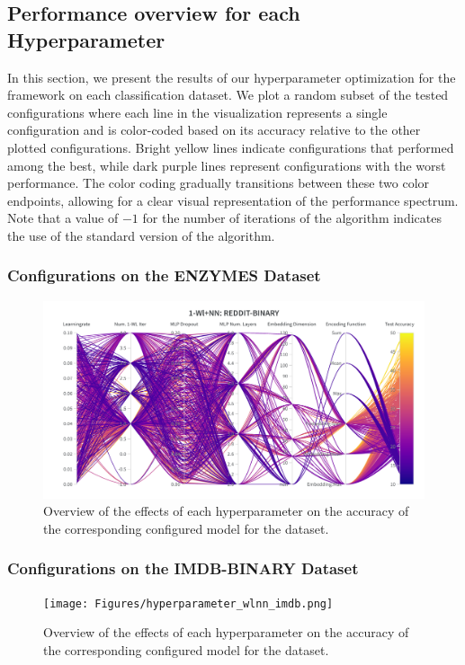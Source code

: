\subsection{Performance overview for each Hyperparameter}
In this section, we present the results of our hyperparameter optimization for the \wlnn framework on each classification dataset. We plot a random subset of the tested configurations where each line in the visualization represents a single configuration and is color-coded based on its accuracy relative to the other plotted configurations. Bright yellow lines indicate configurations that performed among the best, while dark purple lines represent configurations with the worst performance. The color coding gradually transitions between these two color endpoints, allowing for a clear visual representation of the performance spectrum. Note that a value of $-1$ for the number of iterations of the \wl algorithm indicates the use of the standard version of the algorithm.

\subsubsection{\wlnn Configurations on the ENZYMES Dataset}
\begin{figure}[H]
    \centering
    \includegraphics[width=\textwidth, trim={0 75 0 150}, clip]{Figures/hyperparameter_wlnn_enzymes.png}
    \caption{Overview of the effects of each hyperparameter on the accuracy of the corresponding configured \wlnn model for the \enzymes dataset.}
    \label{fig:wandb_wlnn_enzymes}
\end{figure}

\subsubsection{\wlnn Configurations on the IMDB-BINARY Dataset}
\begin{figure}[H]
    \centering
    \texttt{[image: Figures/hyperparameter\_wlnn\_imdb.png]}
    \caption{Overview of the effects of each hyperparameter on the accuracy of the corresponding configured \wlnn model for the \imdb dataset.}
    \label{fig:wandb_wlnn_imdb}
\end{figure}
\clearpage

